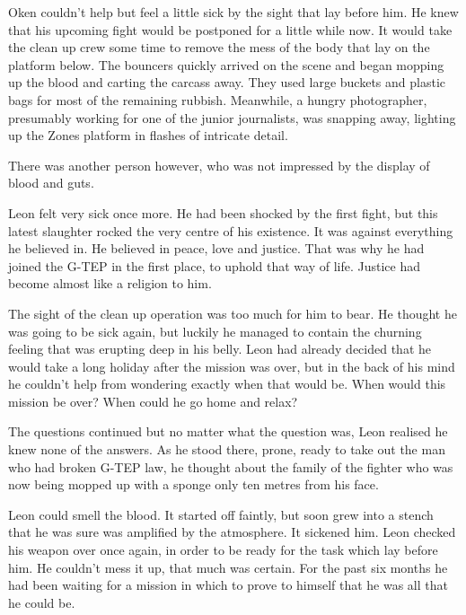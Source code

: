 Oken couldn't help but feel a little sick by the sight that lay before him.  He knew that his upcoming fight would be postponed for a little while now.  It would take the clean up crew some time to remove the mess of the body that lay on the platform below.  The bouncers quickly arrived on the scene and began mopping up the blood and carting the carcass away.  They used large buckets and plastic bags for most of the remaining rubbish.  Meanwhile, a hungry photographer, presumably working for one of the junior journalists, was snapping away, lighting up the Zones platform in flashes of  intricate detail.

There was another person however, who was not impressed by the display of blood and guts.



\thoughtbreak



Leon felt very sick once more.  He had been shocked by the first fight, but this latest slaughter rocked the very centre of his existence.  It was against everything he believed in.  He believed in peace, love and justice.  That was why he had joined the G-TEP in the first place, to uphold that way of life.  Justice had become almost like a religion to him.  

The sight of the clean up operation was too much for him to bear.  He thought he was going to be sick again, but luckily he managed to contain the churning feeling that was erupting deep in his belly.  Leon had already decided that he would take a long holiday after the mission was over, but in the back of his mind he couldn't help from wondering exactly when that would be.  When would this mission be over? When could he go home and relax?  

The questions continued but no matter what the question was, Leon realised he knew none of the answers.  As he stood there, prone, ready to take out the man who had broken G-TEP law, he thought about the family of the fighter who was now being mopped up with a sponge only ten metres from his face.

Leon could smell the blood.  It started off faintly, but soon grew into a stench that he was sure was amplified by the atmosphere.  It sickened him.  Leon checked his weapon over once again, in order to be ready for the task which lay before him.  He couldn't mess it up, that much was certain.  For the past six months he had been waiting for a mission in which to prove to himself that he was all that he could be.

